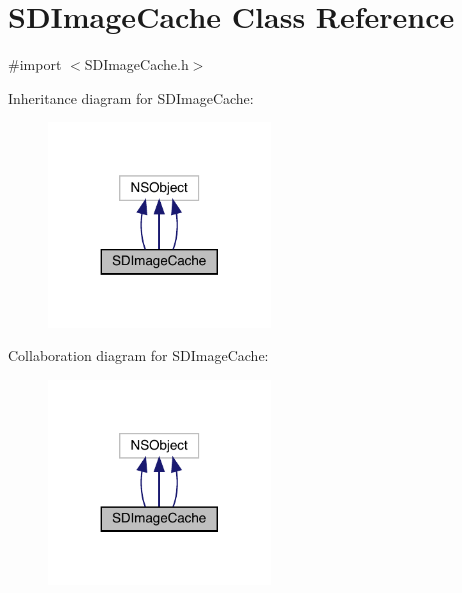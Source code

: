 \hypertarget{interface_s_d_image_cache}{}\section{S\+D\+Image\+Cache Class Reference}
\label{interface_s_d_image_cache}


{\ttfamily \#import $<$S\+D\+Image\+Cache.\+h$>$}



Inheritance diagram for S\+D\+Image\+Cache\+:\nopagebreak
\begin{figure}[H]
\begin{center}
\leavevmode
\includegraphics[width=167pt]{interface_s_d_image_cache__inherit__graph}
\end{center}
\end{figure}


Collaboration diagram for S\+D\+Image\+Cache\+:\nopagebreak
\begin{figure}[H]
\begin{center}
\leavevmode
\includegraphics[width=167pt]{interface_s_d_image_cache__coll__graph}
\end{center}
\end{figure}
